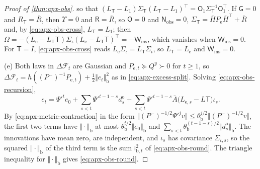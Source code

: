 \begin{proof}[Proof of \cref{thm:apx-obs}]
so that $(L_{\mathsf T}-L_1)\Sigma_{\mathsf T}(L_{\mathsf T}-L_1)^\top=\mathsf O_1\Sigma_{\mathsf T}^{-1}\mathsf O_1^\top$. If $\mathsf G=0$ and $R_{\mathsf T}=\bar R$, then $\Upsilon=0$ and $\mathsf R=\bar R$, so $\mathsf O=0$ and $\mathsf N_{\mathrm{obs}}=0$, $\Sigma_{\mathsf T}=\bar HP_{\mathrm e}\bar H^\top+\bar R$ and, by \eqref{eq:apx-obs-cross}, $L_{\mathsf T}=L_1$; then $\Omega=-(L_{\mathrm e}-L_{\mathsf T}\mathsf T)\Sigma_\iota(L_{\mathrm e}-L_{\mathsf T}\mathsf T)^\top=-\mathsf W_{\mathrm{ins}}$, which vanishes when $\mathsf W_{\mathrm{ins}}=0$. For $\mathsf T=I$, \eqref{eq:apx-obs-cross} reads $L_{\mathrm e}\Sigma_\iota=L_{\mathsf T}\Sigma_\iota$, so $L_{\mathsf T}=L_{\mathrm e}$ and $\mathsf W_{\mathrm{ins}}=0$.

(e) Both laws in $\Delta\mathcal F_t$ are Gaussian and $P_{\mathrm e,t}\succeq Q^y\succ0$ for $t\ge1$, so $\Delta\mathcal F_t=h((P^-)^{-1}P_{\mathrm e,t})+\frac12\Vert e_t\Vert_{\mathrm b}^2$ as in \cref{eq:apx-excess-split}. Solving \eqref{eq:apx-obs-recursion},
\begin{equation*}
e_t=\Psi'^te_0+\sum_{s<t}\Psi'^{t-1-s}d^{\mathrm o}_s+\sum_{s<t}\Psi'^{t-1-s}\bar A\bigl(L_{\mathrm e,s}-L\mathsf T\bigr)\iota_s .
\end{equation*}
By \cref{eq:apx-metric-contraction} in the form $\Vert(P^-)^{-1/2}\Psi'^jv\Vert\le\theta_{\mathrm b}^{j/2}\Vert(P^-)^{-1/2}v\Vert$, the first two terms have $\Vert\cdot\Vert_{\mathrm b}$ at most $\theta_{\mathrm b}^{t/2}\Vert e_0\Vert_{\mathrm b}$ and $\sum_{s<t}\theta_{\mathrm b}^{(t-1-s)/2}\Vert d^{\mathrm o}_s\Vert_{\mathrm b}$. The innovations have mean zero, are independent, and $\iota_s$ has covariance $\Sigma_{\iota,s}$, so the squared $\Vert\cdot\Vert_{\mathrm b}$ of the third term is the sum $\mathsf i_{\mathrm b,t}^2$ of \eqref{eq:apx-obs-round}. The triangle inequality for $\Vert\cdot\Vert_{\mathrm b}$ gives \eqref{eq:apx-obs-round}.


\end{proof}
